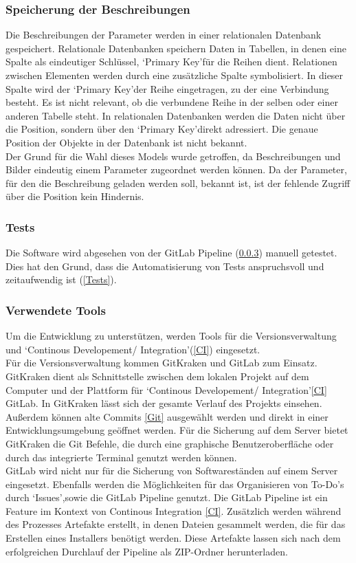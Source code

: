 \subsubsection{Speicherung der Beschreibungen}
Die Beschreibungen der Parameter werden in einer relationalen Datenbank gespeichert. Relationale Datenbanken speichern Daten in Tabellen, in denen eine Spalte als eindeutiger Schlüssel, \lq Primary Key\rq\space für die Reihen dient. Relationen zwischen Elementen werden durch eine zusätzliche Spalte symbolisiert. In dieser Spalte wird der \lq Primary Key\rq\space der Reihe eingetragen, zu der eine Verbindung besteht. Es ist nicht relevant, ob die verbundene Reihe in der selben oder einer anderen Tabelle steht. In relationalen Datenbanken werden die Daten nicht über die Position, sondern über den \lq Primary Key\rq\space direkt adressiert. Die genaue Position der Objekte in der Datenbank ist nicht bekannt\cite{10.1145/1283920.1283937}.\\
Der Grund für die Wahl dieses Models wurde getroffen, da Beschreibungen und Bilder eindeutig einem Parameter zugeordnet werden können. Da der Parameter, für den die Beschreibung geladen werden soll, bekannt ist, ist der fehlende Zugriff über die Position kein Hindernis.
\subsubsection{Tests}
Die Software wird abgesehen von der GitLab Pipeline (\ref{Tools}) manuell getestet. Dies hat den Grund, dass die Automatisierung von Tests anspruchsvoll und zeitaufwendig ist (\ref{Tests}).
\subsubsection{Verwendete Tools}
\label{Tools}
Um die Entwicklung zu unterstützen, werden Tools für die Versionsverwaltung und \lq Continous Developement/ Integration\rq\space (\ref{CI}) eingesetzt.\\
Für die Versionsverwaltung kommen GitKraken und GitLab zum Einsatz. GitKraken dient als Schnittstelle zwischen dem lokalen Projekt auf dem Computer und der Plattform für \lq Continous Developement/ Integration\rq\space \ref{CI} GitLab. In GitKraken lässt sich der gesamte Verlauf des Projekts einsehen. Außerdem können alte Commits \ref{Git} ausgewählt werden und direkt in einer Entwicklungsumgebung geöffnet werden. Für die Sicherung auf dem Server bietet GitKraken die Git Befehle, die durch eine graphische Benutzeroberfläche oder durch das integrierte Terminal genutzt werden können.\\
GitLab wird nicht nur für die Sicherung von Softwareständen auf einem Server eingesetzt. Ebenfalls werden die Möglichkeiten für das Organisieren von To-Do's durch \lq Issues\rq ,\space sowie die GitLab Pipeline genutzt. Die GitLab Pipeline ist ein Feature im Kontext von Continous Integration \ref{CI}. Zusätzlich werden während des Prozesses Artefakte erstellt, in denen Dateien gesammelt werden, die für das Erstellen eines Installers benötigt werden. Diese Artefakte lassen sich nach dem erfolgreichen Durchlauf der Pipeline als ZIP-Ordner herunterladen.\\ 
